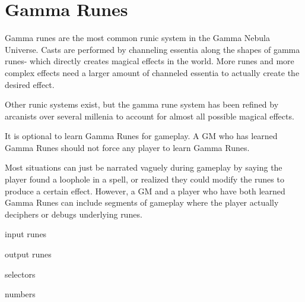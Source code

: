 \chapter{Gamma Runes}

Gamma runes are the most common runic system in the Gamma Nebula Universe. Casts are performed by channeling essentia along the shapes of gamma runes- which directly creates magical effects in the world. More runes and more complex effects need a larger amount of channeled essentia to actually create the desired effect.

Other runic systems exist, but the gamma rune system has been refined by arcanists over several millenia to account for almost all possible magical effects.

It is optional to learn Gamma Runes for gameplay. A GM who has learned Gamma Runes should not force any player to learn Gamma Runes.

Most situations can just be narrated vaguely during gameplay by saying the player found a loophole in a spell, or realized they could modify the runes to produce a certain effect. However, a GM and a player who have both learned Gamma Runes can include segments of gameplay where the player actually deciphers or debugs underlying runes.

input runes



output runes


selectors

numbers